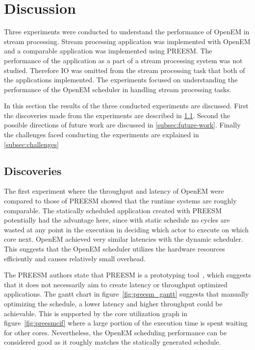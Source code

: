 \section{Discussion}
\label{sec:discussion}
Three experiments were conducted to understand the performance of OpenEM in stream processing. Stream processing application was implemented with OpenEM and a comparable application was implemented using PREESM. The performance of the application as a part of a stream processing system was not studied. Therefore IO was omitted from the stream processing task that both of the applications implemented.  The experiments focused on understanding the performance of the OpenEM scheduler in handling stream processing tasks.

In this section the results of the three conducted experiments are discussed. First the discoveries made from the experiments are described in \ref{subsec:discoveries}. Second the possible directions of future work are discussed in \ref{subsec:future-work}. Finally the challenges faced conducting the experiments are explained in \ref{subsec:challenges}

\subsection{Discoveries}
\label{subsec:discoveries}
\FloatBarrier
The first experiment where the throughput and latency of OpenEM were compared to those of PREESM showed that the runtime systems are roughly comparable. The statically scheduled application created with PREESM potentially had the advantage here, since with static schedule no cycles are wasted at any point in the execution in deciding which actor to execute on which core next. OpenEM achieved very similar latencies with the dynamic scheduler. This suggests that the OpenEM scheduler utilizes the hardware resources efficiently and causes relatively small overhead.

The PREESM authors state that PREESM is a prototyping tool~\cite{preesm}, which suggests that it does not necessarily aim to create latency or throughput optimized applications. The gantt chart in figure~\ref{fig:preesm_gantt} suggests that manually optimizing the schedule, a lower latency and higher throughput could be achievable. This is supported by the core utilization graph in figure~\ref{fig:preesmcif} where a large portion of the execution time is spent waiting for other cores. Nevertheless, the OpenEM scheduling performance can be considered good as it roughly matches the statically generated schedule.

